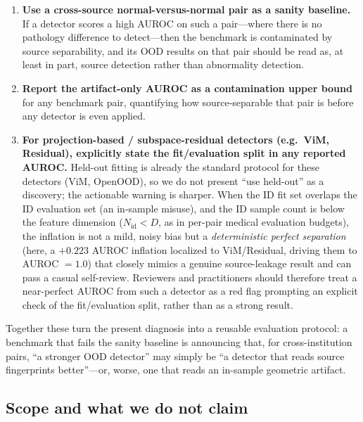 \documentclass{article}
\begin{document}
\begin{enumerate}
  \item \textbf{Use a cross-source normal-versus-normal pair as a sanity
  baseline.} If a detector scores a high AUROC on such a pair---where there is no
  pathology difference to detect---then the benchmark is contaminated by source
  separability, and its OOD results on that pair should be read as, at least in
  part, source detection rather than abnormality detection.
  \item \textbf{Report the artifact-only AUROC as a contamination upper bound}
  for any benchmark pair, quantifying how source-separable that pair is before
  any detector is even applied.
  \item \textbf{For projection-based / subspace-residual detectors (e.g.\ ViM,
  Residual), explicitly state the fit/evaluation split in any reported AUROC.}
  Held-out fitting is already the standard protocol for these detectors (ViM,
  OpenOOD), so we do not present ``use held-out'' as a discovery; the actionable
  warning is sharper. When the ID fit set overlaps the ID evaluation set (an
  in-sample misuse), and the ID sample count is below the feature dimension
  ($N_\text{id} < D$, as in per-pair medical evaluation budgets), the inflation
  is not a mild, noisy bias but a \emph{deterministic perfect separation} (here, a
  $+0.223$ AUROC inflation localized to ViM/Residual, driving them to AUROC
  $=1.0$) that closely mimics a genuine source-leakage result and can pass a
  casual self-review. Reviewers and practitioners should therefore treat a
  near-perfect AUROC from such a detector as a red flag prompting an explicit
  check of the fit/evaluation split, rather than as a strong result.
\end{enumerate}

Together these turn the present diagnosis into a reusable evaluation protocol: a
benchmark that fails the sanity baseline is announcing that, for
cross-institution pairs, ``a stronger OOD detector'' may simply be ``a detector
that reads source fingerprints better''---or, worse, one that reads an in-sample
geometric artifact.

\subsection{Scope and what we do not claim}
\end{document}

